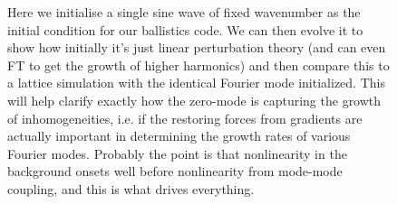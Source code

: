 \documentclass[11pt,a4paper]{article}
\begin{document}
\begin{figure}
  \caption{Here we initialise a single sine wave of fixed wavenumber as the initial condition for our ballistics code.  We can then evolve it to show how initially it's just linear perturbation theory (and can even FT to get the growth of higher harmonics) and then compare this to a lattice simulation with the identical Fourier mode initialized.  This will help clarify exactly how the zero-mode is capturing the growth of inhomogeneities, i.e. if the restoring forces from gradients are actually important in determining the growth rates of various Fourier modes.  Probably the point is that nonlinearity in the background onsets well before nonlinearity from mode-mode coupling, and this is what drives everything.}
\end{figure}



\end{document}
